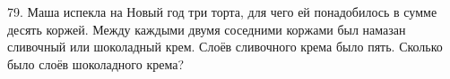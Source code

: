 79. Маша испекла на Новый год три торта, для чего ей понадобилось в сумме десять коржей. Между каждыми двумя соседними коржами был намазан сливочный или шоколадный крем. Слоёв сливочного крема было пять. Сколько было слоёв шоколадного крема?\\
